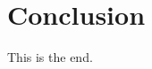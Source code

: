 \documentclass[a4paper,12pt]{article}
\newcommand{\basepath}{.}
\newcommand{\imagepath}{\basepath/images}
\newcommand{\codingpath}{\basepath/coding}
\newcommand{\pdftextpath}{\basepath/pdftex_t}
\newcommand{\pn}{\par\noindent}
\begin{document}


\pagebreak


\pagebreak








\section{Conclusion}



\pn This is the end.
\end{document}
